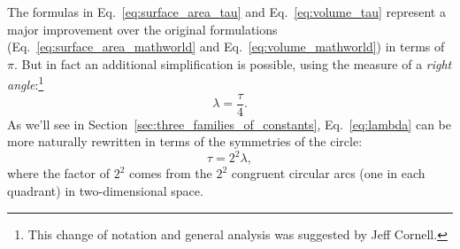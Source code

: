 The formulas in Eq.~\eqref{eq:surface_area_tau} and Eq.~\eqref{eq:volume_tau} represent a major improvement over the original formulations (Eq.~\eqref{eq:surface_area_mathworld} and Eq.~\eqref{eq:volume_mathworld}) in terms of $\pi$. But in fact an additional simplification is possible, using the measure of a \emph{right angle}:\footnote{This change of notation and general analysis was suggested by Jeff Cornell.}
\begin{equation}
\label{eq:lambda}
\lambda = \frac{\tau}{4}.
\end{equation}
As we'll see in Section~\ref{sec:three_families_of_constants}, Eq.~\eqref{eq:lambda} can be more naturally rewritten in terms of the symmetries of the circle:
\begin{equation}
\label{eq:tau_lambda}
\tau = 2^2 \lambda,
\end{equation}
where the factor of $2^2$ comes from the $2^2$ congruent circular arcs (one in each quadrant) in two-dimensional space.

